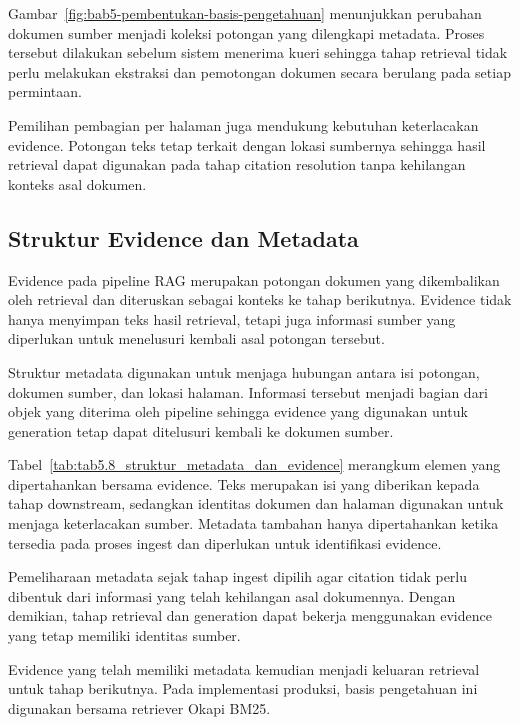 Gambar~\ref{fig:bab5-pembentukan-basis-pengetahuan} menunjukkan perubahan dokumen sumber menjadi koleksi potongan yang dilengkapi metadata. Proses tersebut dilakukan
sebelum sistem menerima kueri sehingga tahap retrieval tidak perlu melakukan ekstraksi dan pemotongan dokumen secara berulang pada setiap permintaan.

Pemilihan pembagian per halaman juga mendukung kebutuhan keterlacakan evidence. Potongan teks tetap terkait dengan lokasi sumbernya sehingga hasil retrieval dapat
digunakan pada tahap citation resolution tanpa kehilangan konteks asal dokumen.

\subsection{Struktur Evidence dan Metadata}
\label{subsec:bab5-struktur-evidence-metadata}

Evidence pada pipeline RAG merupakan potongan dokumen yang dikembalikan oleh retrieval dan diteruskan sebagai konteks ke tahap berikutnya. Evidence tidak hanya
menyimpan teks hasil retrieval, tetapi juga informasi sumber yang diperlukan untuk menelusuri kembali asal potongan tersebut.

Struktur metadata digunakan untuk menjaga hubungan antara isi potongan, dokumen sumber, dan lokasi halaman. Informasi tersebut menjadi bagian dari objek yang
diterima oleh pipeline sehingga evidence yang digunakan untuk generation tetap dapat ditelusuri kembali ke dokumen sumber.



Tabel~\ref{tab:tab5.8_struktur_metadata_dan_evidence} merangkum elemen yang dipertahankan bersama evidence. Teks merupakan isi yang diberikan kepada tahap downstream,
sedangkan identitas dokumen dan halaman digunakan untuk menjaga keterlacakan sumber. Metadata tambahan hanya dipertahankan ketika tersedia pada proses ingest dan
diperlukan untuk identifikasi evidence.

Pemeliharaan metadata sejak tahap ingest dipilih agar citation tidak perlu dibentuk dari informasi yang telah kehilangan asal dokumennya. Dengan demikian, tahap
retrieval dan generation dapat bekerja menggunakan evidence yang tetap memiliki identitas sumber.

Evidence yang telah memiliki metadata kemudian menjadi keluaran retrieval untuk tahap berikutnya. Pada implementasi produksi, basis pengetahuan ini digunakan bersama
retriever Okapi BM25.

